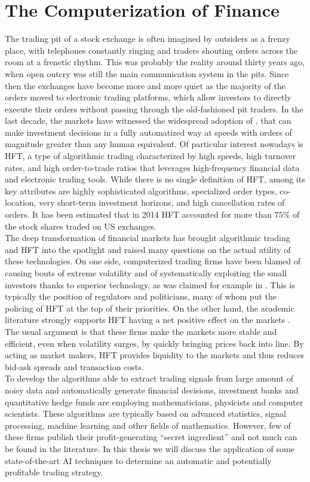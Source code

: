 \section{The Computerization of Finance}
The trading pit of a stock exchange is often imagined by outsiders as a frenzy place, with telephones constantly ringing and traders shouting orders across the room at a frenetic rhythm. This was probably the reality around thirty years ago, when open outcry was still the main communication system in the pits. Since then the exchanges have become more and more quiet as the majority of the orders moved to electronic trading platforms, which allow investors to directly execute their orders without passing through the old-fashioned pit traders. In the last decade, the markets have witnessed the widespread adoption of , that can make investment decisions in a fully automatized way at speeds with orders of magnitude greater than any human equivalent. Of particular interest nowadays is \gls{HFT}, a type of algorithmic trading characterized by high speeds, high turnover rates, and high order-to-trade ratios that leverages high-frequency financial data and electronic trading tools. While there is no single definition of \gls{HFT}, among its key attributes are highly sophisticated algorithms, specialized order types, co-location, very short-term investment horizons, and high cancellation rates of orders. It has been estimated that in 2014 \gls{HFT} accounted for more than $75\%$ of the stock shares traded on US exchanges.\\
The deep transformation of financial markets has brought algorithmic trading and \gls{HFT} into the spotlight and raised many questions on the actual utility of these technologies. On one side, computerized trading firms have been blamed of causing bouts of extreme volatility and of systematically exploiting the small investors thanks to superior technology, as was claimed for example in \cite{lewis2014flash}. This is typically the position of regulators and politicians, many of whom put the policing of \gls{HFT} at the top of their priorities. On the other hand, the academic literature strongly supports \gls{HFT} having a net positive effect on the markets \cite{brogaard2014high}. The usual argument is that these firms make the markets more stable and efficient, even when volatility surges, by quickly bringing prices back into line. By acting as market makers, \gls{HFT} provides liquidity to the markets and thus reduces bid-ask spreads and transaction costs.\\
To develop the algorithms able to extract trading signals from large amount of noisy data and automatically generate financial decisions, investment banks and quantitative hedge funds are employing mathematicians, physicists and computer scientists. These algorithms are typically based on advanced statistics, signal processing, machine learning and other fields of mathematics. However, few of these firms publish their profit-generating ``secret ingredient'' and not much can be found in the literature. In this thesis we will discuss the application of some state-of-the-art \gls{AI} techniques to determine an automatic and potentially profitable trading strategy.

